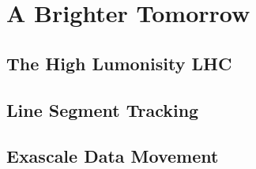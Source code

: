 \chapter{A Brighter Tomorrow}
\section{The High Lumonisity LHC}
\section{Line Segment Tracking}
\section{Exascale Data Movement}
